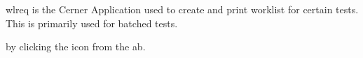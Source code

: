 \gls{wlreq} is the Cerner Application used to create and print worklist for certain tests. This is primarily used for batched tests.

 by clicking the  icon from the \gls{ab}.\\


